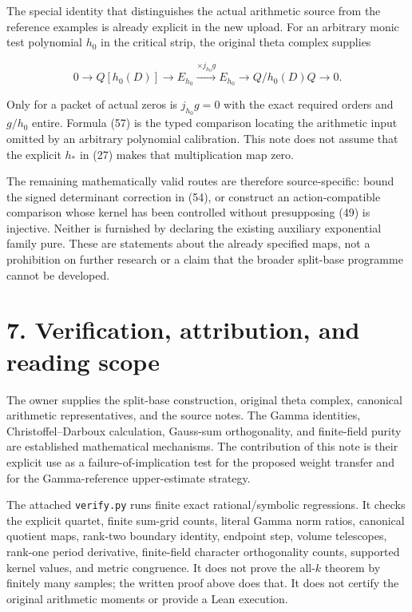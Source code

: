 \documentclass[
  11pt,
]{article}
\begin{document}
The special identity that distinguishes the actual arithmetic source
from the reference examples is already explicit in the new upload. For
an arbitrary monic test polynomial \(h_0\) in the critical strip, the
original theta complex supplies

\[
0\longrightarrow Q[h_0(D)]\longrightarrow E_{h_0}
\xrightarrow{\times j_{h_0}g}E_{h_0}
\longrightarrow Q/h_0(D)Q\longrightarrow0.
\tag{57}
\]

Only for a packet of actual zeros is \(j_{h_0}g=0\) with the exact
required orders and \(g/h_0\) entire. Formula (57) is the typed
comparison locating the arithmetic input omitted by an arbitrary
polynomial calibration. This note does not assume that the explicit
\(h_*\) in (27) makes that multiplication map zero.

The remaining mathematically valid routes are therefore source-specific:
bound the signed determinant correction in (54), or construct an
action-compatible comparison whose kernel has been controlled without
presupposing (49) is injective. Neither is furnished by declaring the
existing auxiliary exponential family pure. These are statements about
the already specified maps, not a prohibition on further research or a
claim that the broader split-base programme cannot be developed.

\section{7. Verification, attribution, and reading
scope}\label{verification-attribution-and-reading-scope}

The owner supplies the split-base construction, original theta complex,
canonical arithmetic representatives, and the source notes. The Gamma
identities, Christoffel--Darboux calculation, Gauss-sum orthogonality,
and finite-field purity are established mathematical mechanisms. The
contribution of this note is their explicit use as a
failure-of-implication test for the proposed weight transfer and for the
Gamma-reference upper-estimate strategy.

The attached \texttt{verify.py} runs finite exact rational/symbolic
regressions. It checks the explicit quartet, finite sum-grid counts,
literal Gamma norm ratios, canonical quotient maps, rank-two boundary
identity, endpoint step, volume telescopes, rank-one period derivative,
finite-field character orthogonality counts, supported kernel values,
and metric congruence. It does not prove the all-\(k\) theorem by
finitely many samples; the written proof above does that. It does not
certify the original arithmetic moments or provide a Lean execution.
\end{document}
